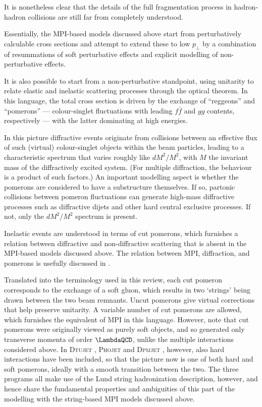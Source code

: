 It is nonetheless clear
that the details of the full fragmentation process in hadron-hadron
collisions are still far from completely understood.


Essentially, the MPI-based models discussed above start from
 perturbatively calculable cross sections and attempt to extend these
 to low $p_\perp$ by a combination of resummations of soft
 perturbative effects and  explicit modelling of
 non-perturbative effects.

It is also possible to start from a non-perturbative standpoint,
using unitarity to relate elastic and inelastic scattering processes
 through the optical theorem. In this language, the total cross
 section is driven by the exchange of ``reggeons'' and ``pomerons''
 --- colour-singlet fluctuations with leading
$f\bar{f}$ and $gg$ contents, respectively ---
 with the latter dominating at high energies.

In this picture diffractive events originate from collisions between
an effective flux of such (virtual) colour-singlet objects within the beam
particles, leading to a characteristic spectrum that varies roughly
like $dM^2/M^2$, with $M$ the invariant mass of the diffractively
excited system. (For
multiple diffraction, the behaviour is a product of such factors.)
An important modelling aspect
is whether the pomerons are considered to have a substructure
themselves. If so, partonic collisions between pomeron
fluctuations can generate high-mass diffractive processes
such as diffractive dijets and other hard central exclusive
processes. If not, only the  $dM^2/M^2$ spectrum is present.

Inelastic events are understood in terms of cut pomerons, which
furnishes a relation between diffractive and non-diffractive
scattering that is absent in the MPI-based models discussed
above. The relation between MPI, diffraction, and pomerons is usefully
discussed in \cite{Treleani:2007gi}.

Translated into the terminology used in this review,
each cut pomeron corresponds
to the exchange of a soft gluon, which results in two `strings'
being drawn between the two beam remnants. Uncut pomerons give
virtual corrections that help preserve unitarity. A variable number
of cut pomerons are allowed, which furnishes the equivalent of
MPI in this language. However,
note that cut pomerons were originally viewed as purely soft objects,
and so generated only transverse momenta of order
$\LambdaQCD$, unlike the multiple interactions considered
above. In \textsc{Dtujet} \cite{Aurenche:1994ev},
\textsc{Phojet} \cite{Engel:1994vs,Engel:1995yda} and \textsc{Dpmjet}
\cite{Ranft:1994fd,Roesler:2000he}, however,
also hard interactions have been included, so
that the picture now is one of both hard and soft pomerons, ideally
with a smooth transition between the two.
The three programs all make use of the Lund string hadronization
description, however, and hence share the fundamental properties and
ambiguities of this part of the
modelling with the string-based MPI models discussed
above.

